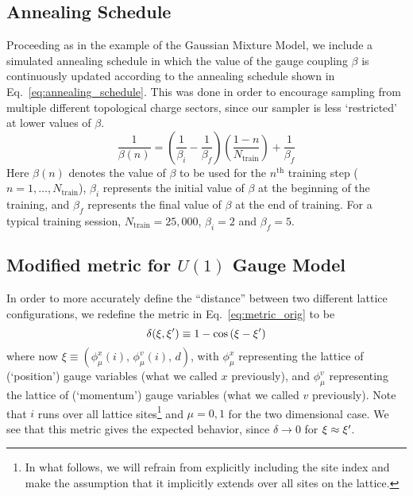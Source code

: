 \subsection{Annealing Schedule}%
\label{subsec:l2hmc_u1annealing}
%
Proceeding as in the example of the Gaussian Mixture Model, we include a
simulated annealing schedule in which the value of the gauge coupling $\beta$
is continuously updated according to the annealing schedule shown in
Eq.~\ref{eq:annealing_schedule}.
%
%
This was done in order to encourage sampling from multiple different
topological charge sectors, since our sampler is less `restricted' at lower
values of $\beta$.
\begin{equation} 
  \frac{1}{\beta(n)} = {\left(\frac{1}{\beta_{i}} 
    - \frac{1}{\beta_{f}}\right)}
    {\left(\frac{1 - n}{N_{\mathrm{train}}}\right)} 
    + \frac{1}{\beta_{f}} 
\label{eq:annealing_schedule} 
\end{equation}
%
Here $\beta(n)$ denotes the value of $\beta$ to be used for the
$n^{\mathrm{th}}$ training step ($n = 1, \ldots, N_{\mathrm{train}}$),
$\beta_{i}$ represents the initial value of $\beta$ at the beginning of the
training, and $\beta_{f}$ represents the final value of $\beta$ at the end of
training.
%
For a typical training session, $N_{\mathrm{train}} = 25,000$, $\beta_{i} = 2$
and $\beta_{f} = 5$.
%

\subsection{Modified metric for \texorpdfstring{$U(1)$}{U (1)} Gauge
Model}%
\label{subsec:l2hmc_modifiedloss}
%
In order to more accurately define the ``distance'' between two different
lattice configurations, we redefine the metric in Eq.~\ref{eq:metric_orig} to
be
%
\begin{equation}
  \delta(\xi, {\xi^{\prime}}) \equiv 1 - \cos\left(\xi - \xi^{\prime}\right)
\label{eq:new_metric}
\end{equation}
%
where now $\xi \equiv {\left(\phi_{\mu}^{x}(i), \,\phi_{\mu}^{v}(i),\,
d\right)}$, with $\phi_{\mu}^{x}$ representing the lattice of (`position')
gauge variables (what we called $x$ previously), and $\phi_{\mu}^{v}$
representing the lattice of (`momentum') gauge variables (what we called $v$
previously). Note that $i$ runs over all lattice sites\footnote{In what
  follows, we will refrain from explicitly including the site index and make
  the assumption that it implicitly extends over all sites on the lattice.} and
  $\mu=0, 1$ for the two dimensional case.
%
We see that this metric gives the expected behavior, since $\delta \rightarrow
0$ for $\xi \approx {\xi^{\prime}}$.

